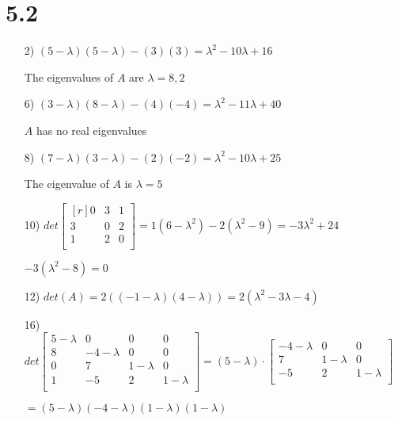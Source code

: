 \documentclass{article}
\begin{document}
\section*{5.2}
\begin{enumerate}
  \item[2)]
    $(5 - \lambda)(5 - \lambda) - (3)(3) = 
    \lambda^2 -10\lambda + 16$

    The eigenvalues of $A$ are $\lambda = 8, 2$ 

  \item[6)]
    $(3 - \lambda)(8 - \lambda) - (4)(-4) =
    \lambda^2 - 11\lambda + 40$

    $A$ has no real eigenvalues

  \item[8)]
    $(7 - \lambda)(3 - \lambda) - (2)(-2) =
    \lambda^2 - 10\lambda + 25$

    The eigenvalue of $A$ is $\lambda = 5$

  \item[10)]
    $det\begin{bmatrix*}[r]
      0 & 3 & 1 \\
      3 & 0 & 2 \\
      1 & 2 & 0 \\
    \end{bmatrix*} =
    1(6 - \lambda^2) - 2(\lambda^2 - 9) = 
    -3\lambda^2 + 24$

    $-3(\lambda^2 - 8) = 0$

  \item[12)]
    $det(A) = 2((-1 - \lambda)(4 - \lambda)) = 
    2(\lambda^2 - 3\lambda - 4)$

  \item[16)]
    $det\begin{bmatrix*}
      5 - \lambda & 0 & 0 & 0 \\
      8 & -4 - \lambda & 0 & 0 \\
      0 & 7  & 1 - \lambda& 0 \\
      1 & -5 & 2 & 1 - \lambda \\
    \end{bmatrix*} =
    (5 - \lambda) \cdot \begin{bmatrix*}
      -4 - \lambda & 0 & 0 \\
      7  & 1 - \lambda& 0 \\       
      -5 & 2 & 1 - \lambda \\    
    \end{bmatrix*}$

    $=(5 - \lambda)(-4 - \lambda)(1 - \lambda)(1 - \lambda)$ 


\end{enumerate}
\end{document}
